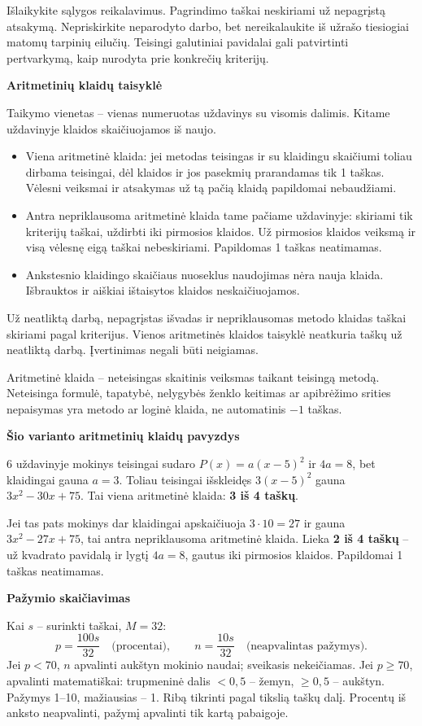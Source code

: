 \documentclass[11pt]{article}
\newcommand{\sk}[1]{\par\medskip\textbf{#1}\par}
\begin{document}
Išlaikykite sąlygos reikalavimus. Pagrindimo taškai neskiriami už nepagrįstą atsakymą. Nepriskirkite neparodyto darbo, bet nereikalaukite iš užrašo tiesiogiai matomų tarpinių eilučių. Teisingi galutiniai pavidalai gali patvirtinti pertvarkymą, kaip nurodyta prie konkrečių kriterijų.
\sk{Aritmetinių klaidų taisyklė}
Taikymo vienetas -- vienas numeruotas uždavinys su visomis dalimis. Kitame uždavinyje klaidos skaičiuojamos iš naujo.
\begin{itemize}
\item Viena aritmetinė klaida: jei metodas teisingas ir su klaidingu skaičiumi toliau dirbama teisingai, dėl klaidos ir jos pasekmių prarandamas tik 1 taškas. Vėlesni veiksmai ir atsakymas už tą pačią klaidą papildomai nebaudžiami.
\item Antra nepriklausoma aritmetinė klaida tame pačiame uždavinyje: skiriami tik kriterijų taškai, uždirbti iki pirmosios klaidos. Už pirmosios klaidos veiksmą ir visą vėlesnę eigą taškai nebeskiriami. Papildomas 1 taškas neatimamas.
\item Ankstesnio klaidingo skaičiaus nuoseklus naudojimas nėra nauja klaida. Išbrauktos ir aiškiai ištaisytos klaidos neskaičiuojamos.
\end{itemize}
Už neatliktą darbą, nepagrįstas išvadas ir nepriklausomas metodo klaidas taškai skiriami pagal kriterijus. Vienos aritmetinės klaidos taisyklė neatkuria taškų už neatliktą darbą. Įvertinimas negali būti neigiamas.

Aritmetinė klaida -- neteisingas skaitinis veiksmas taikant teisingą metodą. Neteisinga formulė, tapatybė, nelygybės ženklo keitimas ar apibrėžimo srities nepaisymas yra metodo ar loginė klaida, ne automatinis $-1$ taškas.

\sk{Šio varianto aritmetinių klaidų pavyzdys}
6 uždavinyje mokinys teisingai sudaro $P(x)=a(x-5)^2$ ir $4a=8$, bet klaidingai gauna $a=3$. Toliau teisingai išskleidęs $3(x-5)^2$ gauna $3 x^{2} - 30 x + 75$. Tai viena aritmetinė klaida: \textbf{3 iš 4 taškų}.

Jei tas pats mokinys dar klaidingai apskaičiuoja $3\cdot10=27$ ir gauna $3 x^{2} - 27 x + 75$, tai antra nepriklausoma aritmetinė klaida. Lieka \textbf{2 iš 4 taškų} -- už kvadrato pavidalą ir lygtį $4a=8$, gautus iki pirmosios klaidos. Papildomai 1 taškas neatimamas.

\sk{Pažymio skaičiavimas}
Kai $s$ -- surinkti taškai, $M=32$:
\[p=\frac{100s}{32}\quad\text{(procentai)},\qquad n=\frac{10s}{32}\quad\text{(neapvalintas pažymys)}.\]
Jei $p<70$, $n$ apvalinti aukštyn mokinio naudai; sveikasis nekeičiamas. Jei $p\ge70$, apvalinti matematiškai: trupmeninė dalis $<0{,}5$ -- žemyn, $\ge0{,}5$ -- aukštyn. Pažymys 1--10, mažiausias -- 1. Ribą tikrinti pagal tikslią taškų dalį. Procentų iš anksto neapvalinti, pažymį apvalinti tik kartą pabaigoje.
\end{document}
